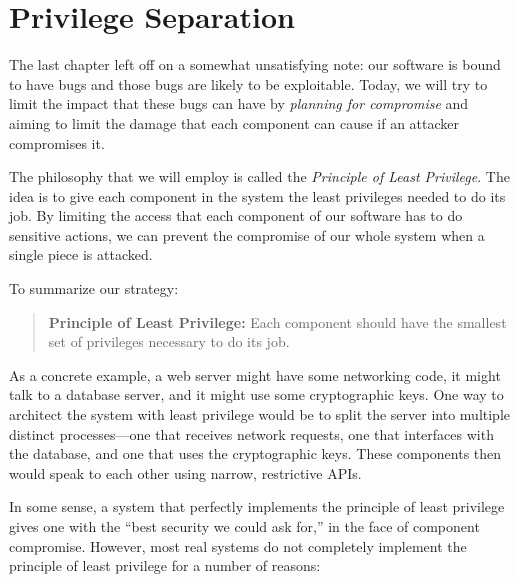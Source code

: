 \chapter{Privilege Separation}


The last chapter left off on a somewhat
unsatisfying note: our software is bound to have
bugs and those bugs are likely to be exploitable.
Today, we will try to limit the impact that these
bugs can have by \emph{planning for compromise}
and aiming to limit the damage that each component
can cause if an attacker compromises it.

The philosophy that we will employ is called the \emph{Principle of Least Privilege}. 
The idea is to give each component in the system the least privileges needed to do 
its job.
By limiting the access that each component of our software has to do sensitive actions, we can prevent the compromise of our whole system when a single piece is attacked.

To summarize our strategy:
\begin{quote}
  \textbf{Principle of Least Privilege:}
	Each component should have the smallest set of privileges necessary to do its job.	
\end{quote}


As a concrete example, a web server might have some networking code, it might
talk to a database server, and it might use some cryptographic keys.
One way to architect the system with least privilege would be to split the
server into multiple distinct processes---one that receives network requests,
one that interfaces with the database, and one that uses the cryptographic keys.
These components then would speak to each other using narrow, restrictive APIs.

In some sense, a system that perfectly implements the principle of least privilege 
gives one with the ``best security we could ask for,'' in the face of component compromise.
However, most real systems do not completely implement the principle of least privilege
for a number of reasons:

